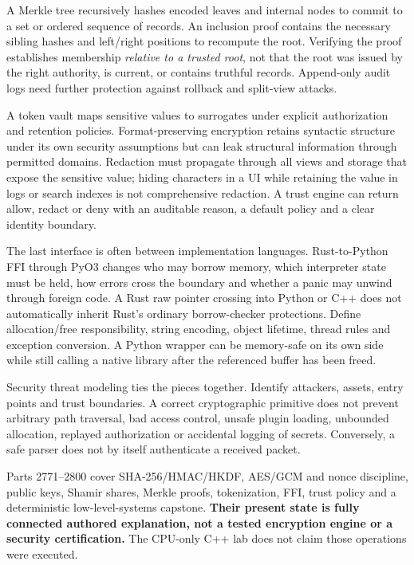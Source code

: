 A Merkle tree recursively hashes encoded leaves and internal nodes to commit to a set or ordered sequence of records. An inclusion proof contains the necessary sibling hashes and left/right positions to recompute the root. Verifying the proof establishes membership \emph{relative to a trusted root}, not that the root was issued by the right authority, is current, or contains truthful records. Append-only audit logs need further protection against rollback and split-view attacks.

A token vault maps sensitive values to surrogates under explicit authorization and retention policies. Format-preserving encryption retains syntactic structure under its own security assumptions but can leak structural information through permitted domains. Redaction must propagate through all views and storage that expose the sensitive value; hiding characters in a UI while retaining the value in logs or search indexes is not comprehensive redaction. A trust engine can return allow, redact or deny with an auditable reason, a default policy and a clear identity boundary.

The last interface is often between implementation languages. Rust-to-Python FFI through PyO3 changes who may borrow memory, which interpreter state must be held, how errors cross the boundary and whether a panic may unwind through foreign code. A Rust raw pointer crossing into Python or C++ does not automatically inherit Rust's ordinary borrow-checker protections. Define allocation/free responsibility, string encoding, object lifetime, thread rules and exception conversion. A Python wrapper can be memory-safe on its own side while still calling a native library after the referenced buffer has been freed.

Security threat modeling ties the pieces together. Identify attackers, assets, entry points and trust boundaries. A correct cryptographic primitive does not prevent arbitrary path traversal, bad access control, unsafe plugin loading, unbounded allocation, replayed authorization or accidental logging of secrets. Conversely, a safe parser does not by itself authenticate a received packet.

Parts 2771--2800 cover SHA-256/HMAC/HKDF, AES/GCM and nonce discipline, public keys, Shamir shares, Merkle proofs, tokenization, FFI, trust policy and a deterministic low-level-systems capstone. \textbf{Their present state is fully connected authored explanation, not a tested encryption engine or a security certification.} The CPU-only C++ lab does not claim those operations were executed.

